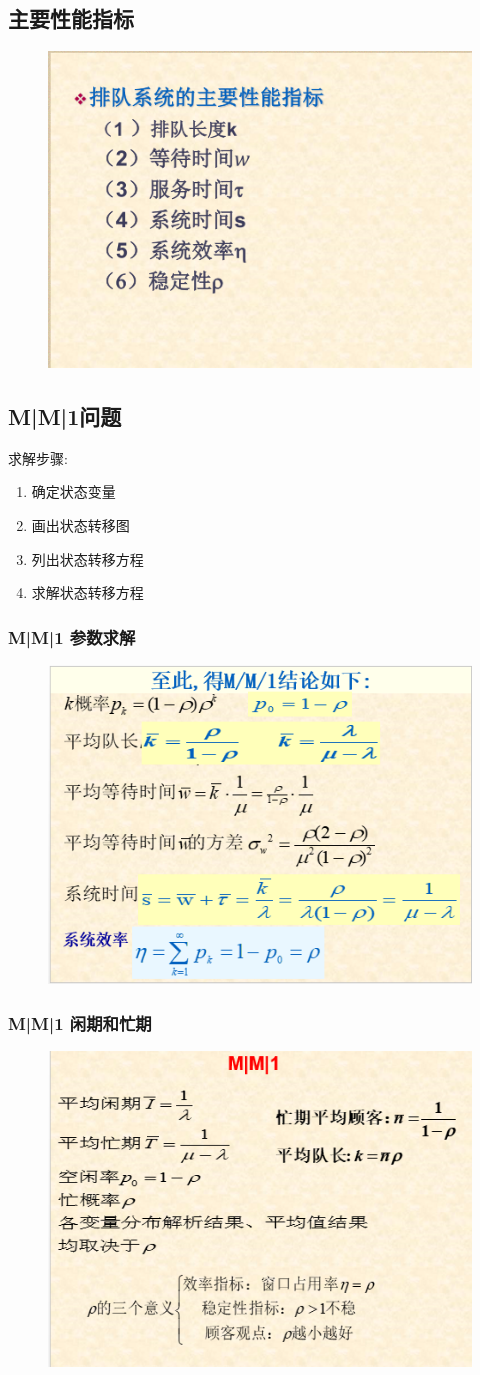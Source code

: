 \documentclass{article}
\begin{document}
	\subsection{主要性能指标}
	\begin{figure}[H]
		\centering
		\includegraphics[width=0.5\linewidth]{figures/prove_4}
		\caption{}
		\label{fig:prove4}
	\end{figure}
	\subsection{M|M|1问题}
	求解步骤:
	\begin{enumerate}
		\item 确定状态变量
		\item 画出状态转移图
		\item 列出状态转移方程
		\item 求解状态转移方程
	\end{enumerate}
	\subsubsection{M|M|1 参数求解}
	\begin{figure}[H]
		\centering
		\includegraphics[width=0.5\linewidth]{figures/prove_5}
		\caption{}
		\label{fig:prove5}
	\end{figure}
	\subsubsection{M|M|1 闲期和忙期}
	\begin{figure}[H]
		\centering
		\includegraphics[width=0.5\linewidth]{figures/prove_6}
		\caption{}
		\label{fig:prove6}
	\end{figure}
\end{document}
